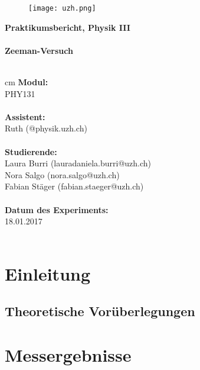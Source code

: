 \documentclass[12pt,a4paper]{article} %
\begin{document}
\begin{titlepage} \begin{figure}[h] \hfill \texttt{[image: uzh.png]} \end{figure}
\vspace{2 cm}
\textbf{\large{Praktikumsbericht, Physik III}} \\ \vspace{1 cm} \\ \textbf{\huge{Zeeman-Versuch}} \\ \normalsize \\ \vspace{1 cm}
\par
\begingroup
{} cm
\rightskip\leftskip
\textbf{Modul:}\\ PHY131 \\ \\
\textbf{Assistent:}\\ Ruth (@physik.uzh.ch)\\ \\
\textbf{Studierende:}\\
Laura Burri (lauradaniela.burri@uzh.ch)\\
Nora Salgo (nora.salgo@uzh.ch)\\
Fabian Stäger (fabian.staeger@uzh.ch) \\ \\
\textbf{Datum des Experiments:}\\ 18.01.2017 \\ \\
\par \endgroup \end{titlepage} \clearpage

\newpage
\tableofcontents
\newpage
\section{Einleitung}
\subsection{Theoretische Vorüberlegungen}


\newpage
\section{Messergebnisse}
\end{document}
